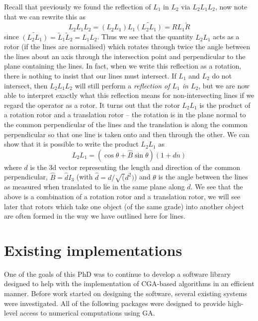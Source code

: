  Recall that
previously we found the reflection of $L_1$ in $L_2$ via
$L_2L_1L_2$, now note that we can rewrite this as
%
\begin{equation}
 L_2L_1L_2 = (L_2L_1)L_1\widetilde{(L_2L_1)} = RL_1\tilde{R}
\end{equation}
%
since $\widetilde{(L_2L_1)} = \tilde{L}_1\tilde{L}_2=L_1L_2$.
Thus we see that the quantity $L_2L_1$ acts as a rotor
(if the lines are normalised) which rotates through twice
the angle between the lines about an axis through the
intersection point and perpendicular to the plane
containing the lines. In fact, when we write this
reflection as a rotation, there is nothing to insist that
our lines must intersect. If $L_1$ and $L_2$ do not
intersect, then $L_2L_1L_2$ will still perform a {\em
reflection of $L_1$ in $L_2$}, but we are now able to
interpret exactly what this reflection means for
non-intersecting lines if we regard the operator as a
rotor. It turns out that the rotor $L_2L_1$ is the
product of a rotation rotor and a translation rotor --
the rotation is in the plane normal to the common
perpendicular of the lines and the translation is along
the common perpendicular so that one line is taken onto
and then through the other. We can show that it is
possible to write the product $L_2L_1$ as
%
\begin{equation}
L_2L_1 = (\cos{\theta} + \hat{B}\sin{\theta})(1 + dn)
\end{equation}
%
where $d$ is the 3d vector representing the length and
direction of the common perpendicular, $\hat{B} =
\hat{d}I_3$ (with $\hat{d}=d/\sqrt(d^2)$) and  $\theta$
is the angle between the lines as measured when
translated to lie in the same plane along $d$. We see
that the above is a combination of a rotation rotor and a
translation rotor, we will see later that rotors which
take one object (of the same grade) into another object
are often formed in the way we have outlined here for
lines.

\section{Existing implementations}

One of the goals of this PhD was to continue to develop a software
library designed to help with the implementation of CGA-based algorithms
in an efficient manner. Before work started on designing 
the software, several existing systems 
were investigated. All of the following packages were designed to
provide high-level access to numerical computations using GA.

